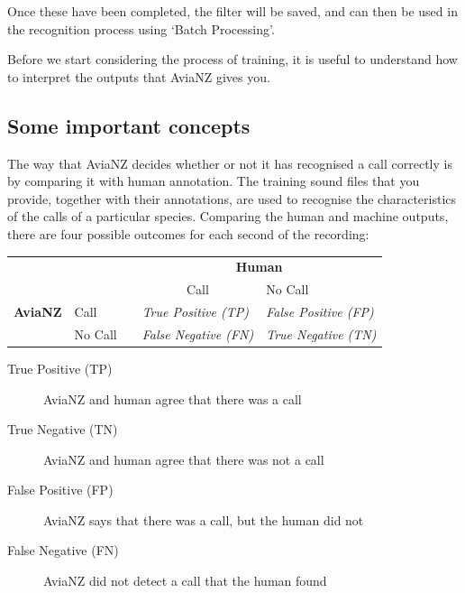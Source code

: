 \documentclass{article}
\begin{document}
Once these have been completed, the filter will be saved, and can then be used in the recognition process using `Batch Processing'. 

Before we start considering the process of training, it is useful to understand how to interpret the outputs that AviaNZ gives you. 

\subsection{Some important concepts}\label{sec:metrics}

The way that AviaNZ decides whether or not it has recognised a call correctly is by comparing it with human annotation. The training sound files that you provide, together with their annotations, are used to recognise the characteristics of the calls of a particular species. Comparing the human and machine outputs, there are four possible outcomes for each second of the recording:

\begin{center}
\begin{tabular}{lllll}
&          &  & \multicolumn{2}{c}{\textbf{Human}}   \\
\cmidrule(lr){4-5}
             &          &  & \multicolumn{1}{c}{Call}                                               & No Call                                                               \\
 \textbf{AviaNZ}                  &\vline \hspace{0.25cm}Call     &  & \textit{True Positive (TP)}  & \textit{False Positive (FP)} \\
                  &\vline \hspace{0.25cm}No Call &  & \textit{False Negative (FN)} & \textit{True Negative (TN)}  \\
\end{tabular}
\end{center}

\begin{description}
\item[True Positive (TP)] AviaNZ and human agree that there was a call 
\item[True Negative (TN)] AviaNZ and human agree that there was not a call
\item[False Positive (FP)] AviaNZ says that there was a call, but the human did not
\item[False Negative (FN)] AviaNZ did not detect a call that the human found
\end{description}
\end{document}
